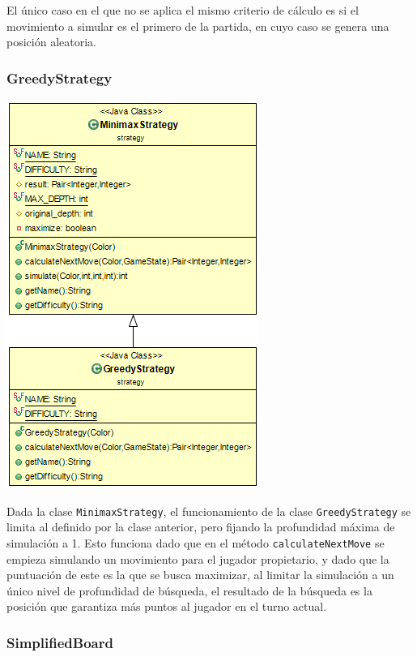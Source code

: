 \documentclass[../DocumentoOficial.tex]{subfiles}
\begin{document}
El único caso en el que no se aplica el mismo criterio de cálculo es si el movimiento a simular es el primero de la partida, en cuyo caso se genera una posición aleatoria.

\subsubsection{GreedyStrategy}

\begin{center}
\includegraphics[scale=0.75]{GreedyStrategy-sprint7.png} 
\end{center}

Dada la clase \texttt{MinimaxStrategy}, el funcionamiento de la clase \texttt{GreedyStrategy} se limita al definido por la clase anterior, pero fijando la profundidad máxima de simulación a 1. Esto funciona dado que en el método \texttt{calculateNextMove} se empieza simulando un movimiento para el jugador propietario, y dado que la puntuación de este es la que se busca maximizar, al limitar la simulación a un único nivel de profundidad de búsqueda, el resultado de la búsqueda es la posición que garantiza más puntos al jugador en el turno actual.

\newpage

\subsubsection{SimplifiedBoard}
\end{document}
